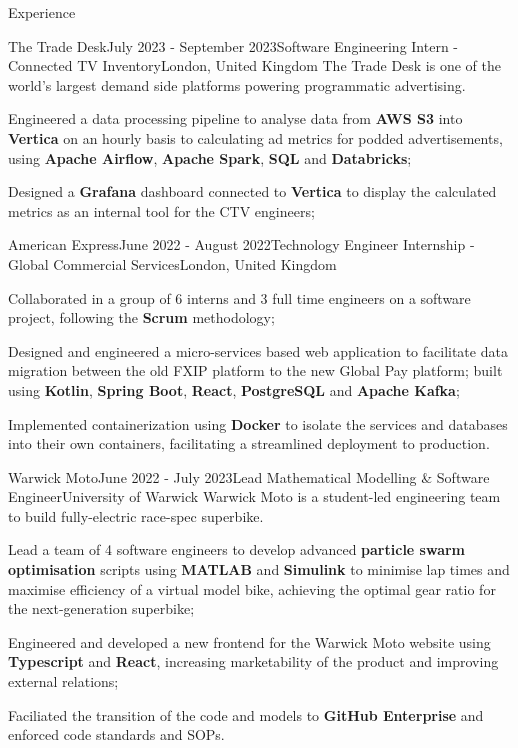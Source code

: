 \documentclass{resume}
\begin{document}
    \begin{rSection}{Experience}
        \begin{rSubsection}{The Trade Desk}{July 2023 - September 2023}{Software Engineering Intern - Connected TV Inventory}{London, United Kingdom}
            {The Trade Desk is one of the world's largest demand side platforms powering programmatic advertising.}
            \item Engineered a data processing pipeline to analyse data from \textbf{AWS S3} into \textbf{Vertica} on an hourly basis to calculating ad metrics for podded advertisements, using \textbf{Apache Airflow}, \textbf{Apache Spark}, \textbf{SQL} and \textbf{Databricks};
            \item Designed a \textbf{Grafana} dashboard connected to \textbf{Vertica} to display the calculated metrics as an internal tool for the CTV engineers;
        \end{rSubsection}

        \begin{rSubsection}{American Express}{June 2022 - August 2022}{Technology Engineer Internship - Global Commercial Services}{London, United Kingdom}{}
            \item Collaborated in a group of 6 interns and 3 full time engineers on a software project, following the \textbf{Scrum} methodology;
            \item Designed and engineered a micro-services based web application to facilitate data migration between the old FXIP platform to the new Global Pay platform; built using \textbf{Kotlin}, \textbf{Spring Boot}, \textbf{React}, \textbf{PostgreSQL} and \textbf{Apache Kafka};
            \item Implemented containerization using \textbf{Docker} to isolate the services and databases into their own containers, facilitating a streamlined deployment to production.
        \end{rSubsection}

        \begin{rSubsection}{Warwick Moto}{June 2022 - July 2023}{Lead Mathematical Modelling \& Software Engineer}{University of Warwick}
            {Warwick Moto is a student-led engineering team to build fully-electric race-spec superbike.}
            \item Lead a team of 4 software engineers to develop advanced \textbf{particle swarm optimisation} scripts using \textbf{MATLAB} and \textbf{Simulink} to minimise lap times and maximise efficiency of a virtual model bike, achieving the optimal gear ratio for the next-generation superbike;
            \item Engineered and developed a new frontend for the Warwick Moto website using \textbf{Typescript} and \textbf{React}, increasing marketability of the product and improving external relations;
            \item Faciliated the transition of the code and models to \textbf{GitHub Enterprise} and enforced code standards and SOPs.
        \end{rSubsection}


\end{rSection}
\end{document}
